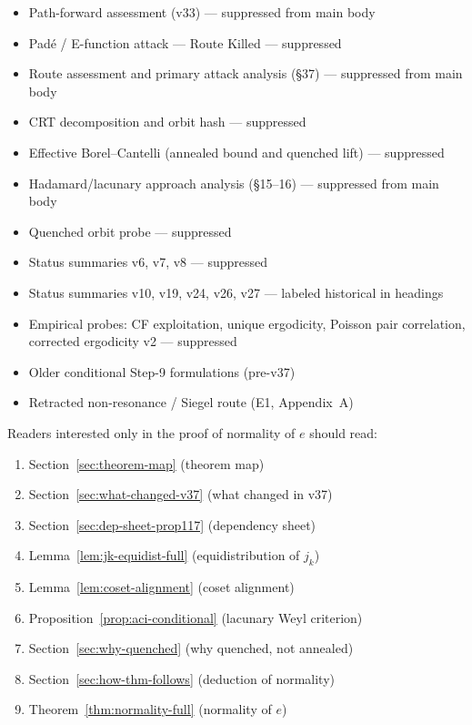 \documentclass[
]{article}
\begin{document}
\begin{itemize}
\item Path-forward assessment (v33) --- suppressed from main body
\item Pad\'e / E-function attack --- Route Killed --- suppressed
\item Route assessment and primary attack analysis (\S37) --- suppressed from main body
\item CRT decomposition and orbit hash --- suppressed
\item Effective Borel--Cantelli (annealed bound and quenched lift) --- suppressed
\item Hadamard/lacunary approach analysis (\S15--16) --- suppressed from main body
\item Quenched orbit probe --- suppressed
\item Status summaries v6, v7, v8 --- suppressed
\item Status summaries v10, v19, v24, v26, v27 --- labeled historical in headings
\item Empirical probes: CF exploitation, unique ergodicity,
      Poisson pair correlation, corrected ergodicity v2 --- suppressed
\item Older conditional Step-9 formulations (pre-v37)
\item Retracted non-resonance / Siegel route (E1, Appendix~A)
\end{itemize}

\medskip\noindent
Readers interested only in the proof of normality of $e$ should read:

\begin{enumerate}
\item Section~\ref{sec:theorem-map} (theorem map)
\item Section~\ref{sec:what-changed-v37} (what changed in v37)
\item Section~\ref{sec:dep-sheet-prop117} (dependency sheet)
\item Lemma~\ref{lem:jk-equidist-full} (equidistribution of $j_k$)
\item Lemma~\ref{lem:coset-alignment} (coset alignment)
\item Proposition~\ref{prop:aci-conditional} (lacunary Weyl criterion)
\item Section~\ref{sec:why-quenched} (why quenched, not annealed)
\item Section~\ref{sec:how-thm-follows} (deduction of normality)
\item Theorem~\ref{thm:normality-full} (normality of $e$)
\end{enumerate}
\end{document}
